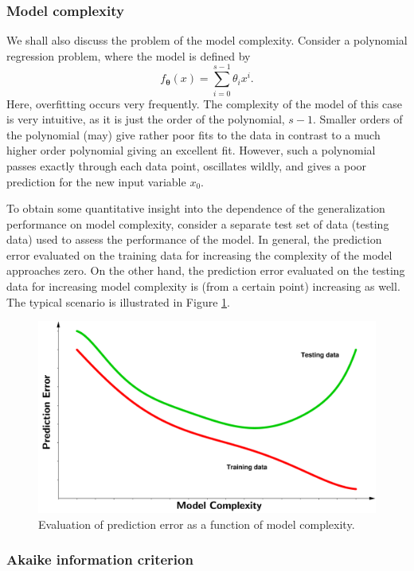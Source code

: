 \subsubsection{Model complexity}
We shall also discuss the problem of the model complexity. Consider a polynomial regression problem,  where the model is defined by
\begin{equation}
	f_{\boldsymbol{\theta}}(x) = \sum_{i=0}^{s-1}\theta_ix^i.
\end{equation}
 Here, overfitting occurs very frequently. The complexity of the model of this case is very intuitive, as it is just the order of the polynomial, $s-1$.  Smaller orders of the polynomial (may) give rather poor fits to the data in contrast to a much higher order polynomial giving an excellent fit. However, such a polynomial passes exactly through each data point, oscillates wildly, and gives a poor prediction for the new input variable $x_{0}$. 
 
To obtain some quantitative insight into the dependence of the generalization performance on model complexity, consider a separate test set of data (testing data) used to assess the performance of the model. 
In general, the prediction error evaluated on the training data for increasing the complexity of the model approaches zero. On the other hand, the prediction error evaluated on the testing data for increasing model complexity is (from a certain point) increasing as well. The typical scenario is illustrated in Figure \ref{fig:Prediction_error}.
 \begin{figure}[h]
	\centering
	\includegraphics[width=16.0cm]{plots/Images/PE3.pdf}
	\caption{Evaluation of prediction error as a function of model complexity.}%
	\label{fig:Prediction_error}%
\end{figure}

\subsubsection{Akaike information criterion}


